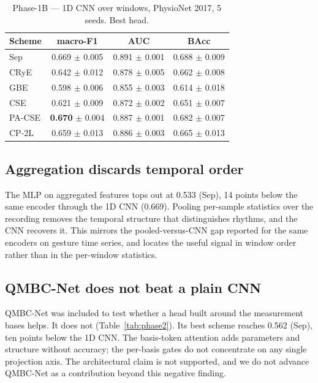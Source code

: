 \documentclass[conference,compsoc]{IEEEtran}
\begin{document}
\begin{table}[t]
\caption{Phase-1B --- 1D CNN over windows, PhysioNet 2017, 5 seeds. Best head.}
\label{tab:phase1b}
\centering
\begin{tabular}{lccc}
\toprule
Scheme & macro-F1 & AUC & BAcc \\
\midrule
Sep    & 0.669 $\pm$ 0.005 & 0.891 $\pm$ 0.001 & 0.688 $\pm$ 0.009 \\
CRyE   & 0.642 $\pm$ 0.012 & 0.878 $\pm$ 0.005 & 0.662 $\pm$ 0.008 \\
GBE    & 0.598 $\pm$ 0.006 & 0.855 $\pm$ 0.003 & 0.614 $\pm$ 0.018 \\
CSE    & 0.621 $\pm$ 0.009 & 0.872 $\pm$ 0.002 & 0.651 $\pm$ 0.007 \\
PA-CSE & \textbf{0.670} $\pm$ 0.004 & 0.887 $\pm$ 0.001 & 0.682 $\pm$ 0.007 \\
CP-2L  & 0.659 $\pm$ 0.013 & 0.886 $\pm$ 0.003 & 0.665 $\pm$ 0.013 \\
\bottomrule
\end{tabular}
\end{table}

\subsection{Aggregation discards temporal order}

The MLP on aggregated features tops out at 0.533 (Sep), 14 points below the same encoder through the 1D CNN (0.669). Pooling per-sample statistics over the recording removes the temporal structure that distinguishes rhythms, and the CNN recovers it. This mirrors the pooled-versus-CNN gap reported for the same encoders on gesture time series, and locates the useful signal in window order rather than in the per-window statistics.

\subsection{QMBC-Net does not beat a plain CNN}

QMBC-Net was included to test whether a head built around the measurement bases helps. It does not (Table~\ref{tab:phase2}). Its best scheme reaches 0.562 (Sep), ten points below the 1D CNN. The basis-token attention adds parameters and structure without accuracy; the per-basis gates do not concentrate on any single projection axis. The architectural claim is not supported, and we do not advance QMBC-Net as a contribution beyond this negative finding.
\end{document}

